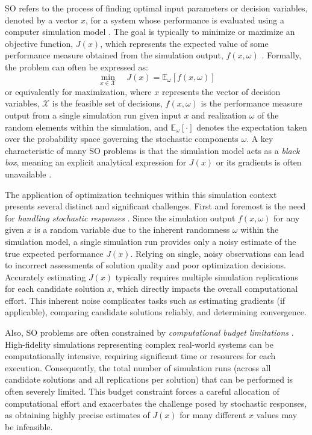 \documentclass{article}
\begin{document}
SO refers to the process of finding optimal input parameters or decision variables, denoted by a vector $x$, for a system whose performance is evaluated using a computer simulation model \cite{andradottir1998simulation}. The goal is typically to minimize or maximize an objective function, $J(x)$, which represents the expected value of some performance measure obtained from the simulation output, $f(x, \omega)$ \cite{gosavi2015simulation}. Formally, the problem can often be expressed as:
\begin{equation}
    \min_{x \in \mathcal{X}} \quad J(x) = \mathbb{E}_{\omega}[f(x, \omega)]
\end{equation}
or equivalently for maximization, where $x$ represents the vector of decision variables, $\mathcal{X}$ is the feasible set of decisions, $f(x, \omega)$ is the performance measure output from a single simulation run given input $x$ and realization $\omega$ of the random elements within the simulation, and $\mathbb{E}_{\omega}[\cdot]$ denotes the expectation taken over the probability space governing the stochastic components $\omega$. A key characteristic of many SO problems is that the simulation model acts as a \textit{black box}, meaning an explicit analytical expression for $J(x)$ or its gradients is often unavailable \cite{cao2024blackbox}.

The application of optimization techniques within this simulation context presents several distinct and significant challenges. First and foremost is the need for \textit{handling stochastic responses} \cite{hong2021surrogate}. Since the simulation output $f(x, \omega)$ for any given $x$ is a random variable due to the inherent randomness $\omega$ within the simulation model, a single simulation run provides only a noisy estimate of the true expected performance $J(x)$. Relying on single, noisy observations can lead to incorrect assessments of solution quality and poor optimization decisions. Accurately estimating $J(x)$ typically requires multiple simulation replications for each candidate solution $x$, which directly impacts the overall computational effort. This inherent noise complicates tasks such as estimating gradients (if applicable), comparing candidate solutions reliably, and determining convergence.

Also, SO problems are often constrained by \textit{computational budget limitations} \cite{chen2011stochastic}. High-fidelity simulations representing complex real-world systems can be computationally intensive, requiring significant time or resources for each execution. Consequently, the total number of simulation runs (across all candidate solutions and all replications per solution) that can be performed is often severely limited. This budget constraint forces a careful allocation of computational effort and exacerbates the challenge posed by stochastic responses, as obtaining highly precise estimates of $J(x)$ for many different $x$ values may be infeasible.
\end{document}
